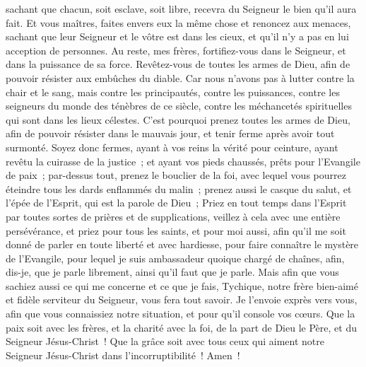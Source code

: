 \begin{multicols}{2}
sachant que chacun, soit esclave, soit libre, recevra du Seigneur le bien qu'il aura fait.
Et vous maîtres, faites envers eux la même chose et renoncez aux menaces, sachant que leur Seigneur et le vôtre est dans les cieux, et qu'il n'y a pas en lui acception de personnes.
Au reste, mes frères, fortifiez-vous dans le Seigneur, et dans la puissance de sa force.
Revêtez-vous de toutes les armes de Dieu, afin de pouvoir résister aux embûches du diable.
Car nous n'avons pas à lutter contre la chair et le sang, mais contre les principautés, contre les puissances, contre les seigneurs du monde des ténèbres de ce siècle, contre les méchancetés spirituelles qui sont dans les lieux célestes.
C'est pourquoi prenez toutes les armes de Dieu, afin de pouvoir résister dans le mauvais jour, et tenir ferme après avoir tout surmonté.
Soyez donc fermes, ayant à vos reins la vérité pour ceinture, ayant revêtu la cuirasse de la justice~;
et ayant vos pieds chaussés, prêts pour l'Evangile de paix~;
par-dessus tout, prenez le bouclier de la foi, avec lequel vous pourrez éteindre tous les dards enflammés du malin~;
prenez aussi le casque du salut, et l'épée de l'Esprit, qui est la parole de Dieu~;
Priez en tout temps dans l'Esprit par toutes sortes de prières et de supplications, veillez à cela avec une entière persévérance, et priez pour tous les saints,
et pour moi aussi, afin qu'il me soit donné de parler en toute liberté et avec hardiesse, pour faire connaître le mystère de l'Evangile,
pour lequel je suis ambassadeur quoique chargé de chaînes, afin, dis-je, que je parle librement, ainsi qu'il faut que je parle.
Mais afin que vous sachiez aussi ce qui me concerne et ce que je fais, Tychique, notre frère bien-aimé et fidèle serviteur du Seigneur, vous fera tout savoir.
Je l'envoie exprès vers vous, afin que vous connaissiez notre situation, et pour qu'il console vos cœurs.
Que la paix soit avec les frères, et la charité avec la foi, de la part de Dieu le Père, et du Seigneur Jésus-Christ~!
Que la grâce soit avec tous ceux qui aiment notre Seigneur Jésus-Christ dans l'incorruptibilité~! Amen~!
\PPE{}
\end{multicols}

